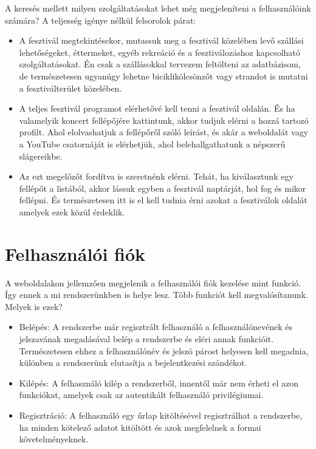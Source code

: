 A keresés mellett milyen szolgáltatásokat lehet még megjeleníteni a felhasználóink számára?
A teljesség igénye nélkül felsorolok párat:
\begin{itemize}

\item A fesztivál megtekintésekor, mutassuk meg a fesztivál közelében levő szállási lehetőségeket, éttermeket, egyéb rekreáció és a fesztiválozáshoz kapcsolható szolgáltatásokat. Én csak a szállásokkal tervezem feltölteni az adatbázisom, de természetesen ugyanúgy lehetne biciklikölcsönzőt vagy strandot is mutatni a fesztiválterület közelében. 
\item A teljes fesztivál programot elérhetővé kell tenni a fesztivál oldalán. És ha valamelyik koncert fellépőjére kattintunk, akkor tudjuk elérni a hozzá tartozó profilt. Ahol elolvashatjuk a fellépőről szóló leírást, és akár a weboldalát vagy a YouTube csatornáját is elérhetjük, ahol belehallgathatunk a népszerű slágereikbe.
\item Az ezt megelőzőt fordítva is szeretnénk elérni. Tehát, ha kiválasztunk egy fellépőt a listából, akkor lássuk egyben a fesztivál naptárját, hol fog és mikor fellépni. És természetesen itt is el kell tudnia érni azokat a fesztiválok oldalát amelyek ezek közül érdeklik.
\end{itemize}

\section{Felhasználói fiók}
A weboldalakon jellemzően megjelenik a felhasználói fiók kezelése mint funkció. Így ennek a mi rendszerünkben is helye lesz.
Több funkciót kell megvalósítanunk. Melyek is ezek?
\begin{itemize}
\item Belépés: A rendszerbe már regisztrált felhasználó a felhasználónevének és jelszavának megadásával belép a rendszerbe és eléri annak funkcióit. Természetesen ehhez a felhasználónév és jelszó párost helyesen kell megadnia, különben a rendszerünk elutasítja a bejelentkezési szándékot.
\item Kilépés: A felhasználó kilép a rendszerből, innentől már nem érheti el azon funkciókat, amelyek csak az autentikált felhasználó privilégiumai.
\item Regisztráció: A felhasználó egy űrlap kitöltésével regisztrálhat a rendszerbe, ha minden kötelező adatot kitöltött és azok megfelelnek a formai követelményeknek.
\end{itemize}

